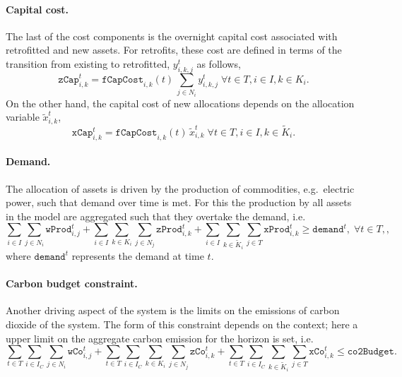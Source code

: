 \documentclass{amsart}
\begin{document}
\paragraph{Capital cost.}
%
The last of the cost components is the overnight capital cost associated with
retrofitted and new assets. 
For retrofits, these cost are defined in terms of the transition
from existing to retrofitted, $y^t_{i,k,j}$ as follows,
%
\begin{equation}
    \mathtt{zCap}^t_{i,k} = 
    \mathtt{fCapCost}_{i,k}\! \left(t\right)\,
    \sum_{j\in N_i}
    y^t_{i,k,j}
    \; \forall t \in T, i \in I, k \in  K_i.
\end{equation}
%
On the other hand, the capital cost of new allocations depends on the allocation
variable $\tilde{x}^t_{i,k}$, 
%
\begin{equation}
    \mathtt{xCap}^t_{i,k} = 
    \mathtt{fCapCost}_{i,k}\! \left(t\right)\,
    \tilde{x}^t_{i,k}
    \; \forall t \in T, i \in I, k \in \tilde{K}_i.
\end{equation}
%
\paragraph{Demand.}
The allocation of assets is driven by the production of commodities, e.g.\
electric power, such that demand over time is met. For this the production by
all assets in the model are aggregated such that they overtake the demand,
i.e.\
\begin{equation}
    \sum_{i\in I} \sum_{j\in N_i} \mathtt{wProd}^t_{i,j} 
    + \sum_{i \in I} \sum_{k \in K_i} \sum_{j\in N_j} \mathtt{zProd}^t_{i,k} 
    + \sum_{i \in I} \sum_{k \in \tilde{K}_i} \sum_{j\in T} 
    \mathtt{xProd}^t_{i,k} 
    \geq \mathtt{demand}^t,
    \; \forall t \in T,,
\end{equation}
%
where $\mathtt{demand}^t$ represents the demand at time $t$. 
%
\paragraph{Carbon budget constraint.}
Another driving aspect of the system is the limits on the emissions of carbon
dioxide of the system. The form of this constraint depends on the context; here
a upper limit on the aggregate carbon emission for the horizon is set, i.e.\
\begin{equation}
    \sum_{t\in T} \sum_{i\in I_C} \sum_{j\in N_i} \mathtt{wCo}^t_{i,j} 
    + \sum_{t\in T} \sum_{i \in I_C} \sum_{k \in K_i} \sum_{j\in N_j}
    \mathtt{zCo}^t_{i,k} 
    + \sum_{t\in T} \sum_{i \in I_C} \sum_{k \in \tilde{K}_i} \sum_{j\in T} 
    \mathtt{xCo}^t_{i,k} 
    \leq \mathtt{co2Budget}.
    \label{eq:co2budgeteq}
\end{equation}
\end{document}
